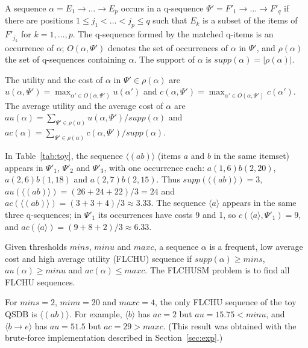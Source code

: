 \documentclass[runningheads]{llncs}
\newcommand{\supp}{\ensuremath{\mathit{supp}}}
\newcommand{\au}{\ensuremath{\mathit{au}}}
\newcommand{\ac}{\ensuremath{\mathit{ac}}}
\newcommand{\minu}{\ensuremath{\mathit{minu}}}
\newcommand{\maxc}{\ensuremath{\mathit{maxc}}}
\newcommand{\mins}{\ensuremath{\mathit{mins}}}
\newcommand{\seq}[1]{\langle #1\rangle}
\begin{document}
\begin{definition}[Occurrence]
A sequence $\alpha = E_1 \to \dots \to E_p$ occurs in a q-sequence
$\Psi' = F'_1 \to \dots \to F'_q$ if there are positions $1 \le j_1 < \dots < j_p \le q$ such
that $E_k$ is a subset of the items of $F'_{j_k}$ for $k = 1, \dots, p$. The q-sequence formed
by the matched q-items is an occurrence of $\alpha$; $O(\alpha,\Psi')$ denotes the set of
occurrences of $\alpha$ in $\Psi'$, and $\rho(\alpha)$ the set of q-sequences containing
$\alpha$. The support of $\alpha$ is $\supp(\alpha) = |\rho(\alpha)|$.
\end{definition}

\begin{definition}
The utility and the cost of $\alpha$ in $\Psi' \in \rho(\alpha)$ are
$u(\alpha,\Psi') = \max_{\alpha' \in O(\alpha,\Psi')} u(\alpha')$ and
$c(\alpha,\Psi') = \max_{\alpha' \in O(\alpha,\Psi')} c(\alpha')$. The average utility and the
average cost of $\alpha$ are
$\au(\alpha) = \sum_{\Psi' \in \rho(\alpha)} u(\alpha,\Psi') / \supp(\alpha)$ and
$\ac(\alpha) = \sum_{\Psi' \in \rho(\alpha)} c(\alpha,\Psi') / \supp(\alpha)$.
\end{definition}

\begin{example}
In Table~\ref{tab:toy}, the sequence $\seq{(ab)}$ (items $a$ and $b$ in the same itemset)
appears in $\Psi'_1$, $\Psi'_2$ and $\Psi'_3$, with one occurrence each:
$a(1,6)b(2,20)$, $a(2,6)b(1,18)$ and $a(2,7)b(2,15)$. Thus $\supp(\seq{(ab)}) = 3$,
$\au(\seq{(ab)}) = (26 + 24 + 22)/3 = 24$ and $\ac(\seq{(ab)}) = (3 + 3 + 4)/3 \approx 3.33$.
The sequence $\seq{a}$ appears in the same three q-sequences; in $\Psi'_1$ its occurrences have
costs 9 and 1, so $c(\seq{a},\Psi'_1) = 9$, and $\ac(\seq{a}) = (9 + 8 + 2)/3 \approx 6.33$.
\end{example}

\begin{definition}
Given thresholds $\mins$, $\minu$ and $\maxc$, a sequence $\alpha$ is a frequent, low average
cost and high average utility (FLCHU) sequence if $\supp(\alpha) \ge \mins$,
$\au(\alpha) \ge \minu$ and $\ac(\alpha) \le \maxc$. The FLCHUSM problem is to find all FLCHU
sequences.
\end{definition}

\begin{example}\label{ex:result}
For $\mins = 2$, $\minu = 20$ and $\maxc = 4$, the only FLCHU sequence of the toy QSDB is
$\seq{(ab)}$. For example, $\seq{b}$ has $\ac = 2$ but $\au = 15.75 < \minu$, and
$\seq{b \to e}$ has $\au = 51.5$ but $\ac = 29 > \maxc$. (This result was obtained with the
brute-force implementation described in Section~\ref{sec:exp}.)
\end{example}
\end{document}
